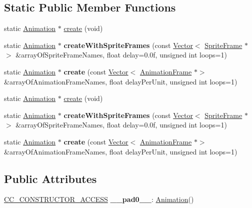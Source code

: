 \subsection*{Static Public Member Functions}
\begin{DoxyCompactItemize}
\item 
static \hyperlink{classAnimation}{Animation} $\ast$ \hyperlink{classAnimation_a407cccd7d74a3ad381224410f00455f1}{create} (void)
\item 
\mbox{\label{classAnimation_afd8c21efbc6a3dafa70133a737c174b7}} 
static \hyperlink{classAnimation}{Animation} $\ast$ {\bfseries create\+With\+Sprite\+Frames} (const \hyperlink{classVector}{Vector}$<$ \hyperlink{classSpriteFrame}{Sprite\+Frame} $\ast$$>$ \&array\+Of\+Sprite\+Frame\+Names, float delay=0.\+0f, unsigned int loops=1)
\item 
\mbox{\label{classAnimation_a00a7d2b8bf767aed89bac919ff6b273f}} 
static \hyperlink{classAnimation}{Animation} $\ast$ {\bfseries create} (const \hyperlink{classVector}{Vector}$<$ \hyperlink{classAnimationFrame}{Animation\+Frame} $\ast$$>$ \&array\+Of\+Animation\+Frame\+Names, float delay\+Per\+Unit, unsigned int loops=1)
\item 
static \hyperlink{classAnimation}{Animation} $\ast$ \hyperlink{classAnimation_ae15070d95f9de1a22d3b897570cda695}{create} (void)
\item 
\mbox{\label{classAnimation_a18ef1b75b79a567e065cbf4bc85910cd}} 
static \hyperlink{classAnimation}{Animation} $\ast$ {\bfseries create\+With\+Sprite\+Frames} (const \hyperlink{classVector}{Vector}$<$ \hyperlink{classSpriteFrame}{Sprite\+Frame} $\ast$$>$ \&array\+Of\+Sprite\+Frame\+Names, float delay=0.\+0f, unsigned int loops=1)
\item 
\mbox{\label{classAnimation_a805c17320db567b322a70fd34b5f383d}} 
static \hyperlink{classAnimation}{Animation} $\ast$ {\bfseries create} (const \hyperlink{classVector}{Vector}$<$ \hyperlink{classAnimationFrame}{Animation\+Frame} $\ast$$>$ \&array\+Of\+Animation\+Frame\+Names, float delay\+Per\+Unit, unsigned int loops=1)
\end{DoxyCompactItemize}
\subsection*{Public Attributes}
\begin{DoxyCompactItemize}
\item 
\mbox{\label{classAnimation_ab23ec12b344cd7d5eb0486efe9597e05}} 
\hyperlink{_2cocos2d_2cocos_2base_2ccConfig_8h_a25ef1314f97c35a2ed3d029b0ead6da0}{C\+C\+\_\+\+C\+O\+N\+S\+T\+R\+U\+C\+T\+O\+R\+\_\+\+A\+C\+C\+E\+SS} {\bfseries \+\_\+\+\_\+pad0\+\_\+\+\_\+}\+: \hyperlink{classAnimation}{Animation}()
\end{DoxyCompactItemize}
